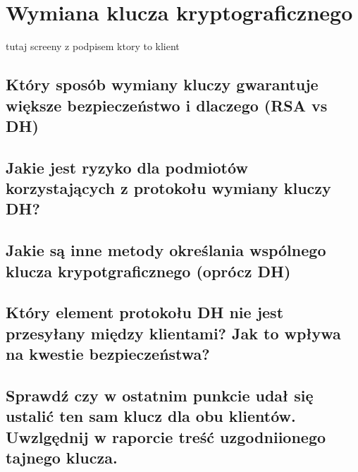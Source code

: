 \documentclass{article}
\begin{document}
\section{Wymiana klucza kryptograficznego}
tutaj screeny z podpisem ktory to klient
\subsection{Który sposób wymiany kluczy gwarantuje większe bezpieczeństwo i dlaczego (RSA vs DH)}
\subsection{Jakie jest ryzyko dla podmiotów korzystających z protokołu wymiany kluczy DH?}
\subsection{Jakie są inne metody określania wspólnego klucza krypotgraficznego (oprócz DH)}
\subsection{Który element protokołu DH nie jest przesyłany między klientami? Jak to wpływa na kwestie bezpieczeństwa?}
\subsection{Sprawdź czy w ostatnim punkcie udał się ustalić ten sam klucz dla obu klientów. Uwzlgędnij w raporcie treść uzgodniionego tajnego klucza.}
\end{document}
